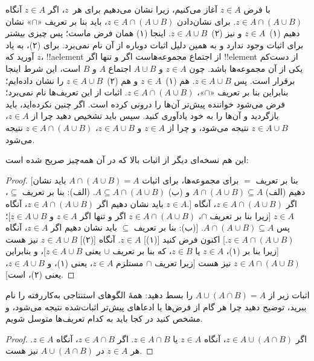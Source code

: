 \documentclass[../../../include/open-logic-section]{subfiles}
\begin{document}
با فرض $z \in A$ آغاز می‌کنیم، زیرا نشان می‌دهیم برای هر~$z$، اگر
$z \in A$ آنگاه $z \in A \cap (A \cup B)$. برای نشان‌دادن
$z \in A \cap (A \cup B)$، باید بنا بر تعریف «$\cap$» نشان دهیم
(۱)~$z \in A$ و نیز (۲)~$z \in A \cup B$. اینجا (۱) همان فرض ماست؛
پس چیزی بیشتر برای اثبات وجود ندارد و به همین دلیل اثبات دوباره از آن
نام نمی‌برد. برای (۲)، به یاد آورید که $z$، !!a{element} از اجتماع
مجموعه‌هاست اگر و تنها اگر !!{element} از دست‌کم یکی از آن مجموعه‌ها
باشد. چون $z \in A$ و $A \cup B$ اجتماع $A$ و $B$ است، این شرط اینجا
برقرار است. پس $z \in A \cup B$. هم (۱)~$z \in A$ و هم
(۲)~$z \in A \cup B$ را نشان داده‌ایم؛ بنابراین بنا بر تعریف «$\cap$»،
$z \in A \cap (A \cup B)$. اثبات از این تعریف‌ها نام نمی‌برد؛ فرض
می‌شود خواننده پیش‌تر آن‌ها را درونی کرده است. اگر چنین نکرده‌اید، باید
بازگردید و آن‌ها را به خود یادآوری کنید. سپس باید تشخیص دهید چرا از
$z \in A$، $z \in A \cup B$ نتیجه می‌شود، و چرا از $z \in A$ و
$z \in A \cup B$، $z \in A \cap (A \cup B)$ نتیجه می‌شود.

این هم نسخه‌ای دیگر از اثبات بالا که در آن همه‌چیز صریح شده است:
\begin{proof}{}
[بنا بر تعریف $=$ برای مجموعه‌ها، برای اثبات
  $A \cap (A \cup B) = A$ باید نشان دهیم (الف)
  $A \cap (A \cup B) \subseteq A$ و (ب)
  $A \subseteq A \cap (A \cup B)$. (الف): بنا بر تعریف $\subseteq$،
  باید نشان دهیم اگر $z \in A \cap (A \cup B)$، آنگاه $z \in A$.]
اگر $z \in A \cap (A \cup B)$، آنگاه $z \in A$
[زیرا بنا بر تعریف $\cap$، $z \in A \cap (A \cup B)$ اگر و تنها اگر
  $z \in A$ و $z \in A \cup B$]؛ پس
$A \cap (A \cup B) \subseteq A$. [(ب): بنا بر تعریف $\subseteq$ باید
  نشان دهیم اگر $z \in A$، آنگاه $z \in A \cap (A \cup B)$.]
اکنون فرض کنید [(۱)] $z \in A$. آنگاه [(۲)] $z \in A \cup B$ نیز هست
[زیرا بنا بر (۱)، $z \in A$ یا $z \in B$، که بنا بر تعریف $\cup$ یعنی
  $z \in A \cup B$]، و بنابراین $z \in A \cap (A \cup B)$ نیز هست
[زیرا تعریف $\cap$ مستلزم $z \in A$، یعنی (۱)، و $z \in A \cup B$،
  یعنی (۲)، است].
\end{proof}

\begin{prob}
اثبات زیر از $A \cup (A \cap B) = A$ را بسط دهید: همهٔ الگوهای
استنتاجی به‌کاررفته را نام ببرید، توضیح دهید چرا هر گام از فرض‌ها یا
ادعاهای پیش‌تر اثبات‌شده نتیجه می‌شود، و مشخص کنید در کجا باید به کدام
تعریف‌ها متوسل شویم.
\begin{proof}
  اگر $z \in A \cup (A \cap B)$، آنگاه $z \in A$ یا
  $z \in A \cap B$. اگر $z \in A \cap B$، آنگاه $z \in A$. هر
  $z \in A$ در $A \cup (A \cap B)$ نیز هست.
\end{proof}
\end{prob}
\end{document}
